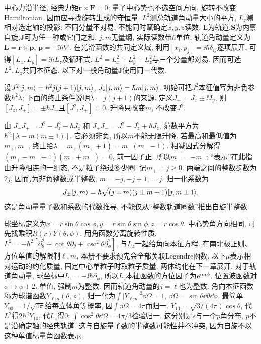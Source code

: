 中心力沿半径, 经典力矩$\boldsymbol r\times\boldsymbol F=0$; 量子中心势也不选空间方向, 旋转不改变Hamiltonian. 因而应寻找旋转生成的守恒量. $L^2$测总轨道角动量大小的平方, $L_z$测相对选定轴的投影; 不同分量不对易, 不能同时赋确定$x,y,z$读数. $\boldsymbol L$为轨道,$\boldsymbol S$为内禀自旋,$\boldsymbol J$可为任一种或它们之和. $j,m$无量纲, 实际读数带$\hbar$单位. 轨道角动量定义为$\boldsymbol L=\boldsymbol r\times\boldsymbol p$, $\boldsymbol p=-\ii\hbar\nabla$. 在光滑函数的共同定义域, 利用$[x_i,p_j]=\ii\hbar\delta_{ij}$逐项展开, 可得$[L_x,L_y]=\ii\hbar L_z$及循环式. $L^2=L_x^2+L_y^2+L_z^2$与三个分量都对易. 因而可选$L^2,L_z$共同本征态. 以下对一般角动量$\boldsymbol J$使用同一代数.

设$J^2\lvert j,m\rangle=\hbar^2j(j+1)\lvert j,m\rangle$, $J_z\lvert j,m\rangle=\hbar m\lvert j,m\rangle$. 初始可把$J^2$本征值写为非负参数$\hbar^2\lambda$; 下面的终止条件说明$\lambda=j(j+1)$的来源. 定义$J_\pm=J_x\pm\ii J_y$, 则$[J_z,J_\pm]=\pm\hbar J_\pm$且$[J^2,J_\pm]=0$. 升降只改变$m$, 不改变$J^2$.

由 $J_-J_+=J^2-J_z^2-\hbar J_z$ 和 $J_+J_-=J^2-J_z^2+\hbar J_z$, 范数平方为$\hbar^2[\lambda-m(m\pm1)]$. 它必须非负, 所以$m$不能无限升降. 若最高和最低值为$m_+,m_-$, 终止给$\lambda=m_+(m_++1)=m_-(m_--1)$. 相减因式分解得$(m_+-m_-+1)(m_++m_-)=0$, 前一因子正, 所以$m_-=-m_+$; “表示”在此指由升降相连的一组态, 不是粒子绕过多少圈. 记$m_+=j\ge0$. 两端之间的整数步数为$2j$, 因而$j$为非负整数或半整数, $m=-j,-j+1,\ldots,j$. 归一化系数为
\[
J_\pm\lvert j,m\rangle=\hbar\sqrt{(j\mp m)(j\pm m+1)}\lvert j,m\pm1\rangle.
\]
这是角动量量子数和系数的代数推导, 不能仅从“整数轨道圈数”推出自旋半整数.

球坐标定义为$x=r\sin\theta\cos\phi,y=r\sin\theta\sin\phi,z=r\cos\theta$. 中心势角方向相同, 可先找乘积$R(r)Y(\theta,\phi)$, 用角函数分离旋转性质. $L^2=-\hbar^2[\partial_\theta^2+\cot\theta\partial_\theta+\csc^2\theta\partial_\phi^2]$, 与$L_z$一起给角向本征方程. 在南北极正则、方位单值的解限制$\ell,m$, 本册不要求预先会全部关联Legendre函数. 以下$\mu$表示相对运动的约化质量, 固定中心单粒子时取粒子质量; 两体约化在下一章展开. 对于轨道角动量, 球坐标中$L_z=-\ii\hbar\partial_\phi$, 所以$L_z$本征函数的方位因子为$\mathrm e^{\mathrm i m\phi}$. 位置波函数对$\phi\mapsto\phi+2\pi$单值, 强制$m$为整数. 因而轨道角动量的$j=\ell$也为整数. 角向本征函数称为球谐函数$Y_{\ell m}(\theta,\phi)$, 归一化为$\int|Y_{\ell m}|^2\dd\Omega=1$, $\dd\Omega=\sin\theta\dd\theta\dd\phi$. 最简单$Y_{00}=1/\sqrt{4\pi}$给每立体角等概率, 因$\int\dd\Omega=4\pi$而归一. $Y_{10}=\sqrt{3/(4\pi)}\cos\theta$, 代$L^2$得$2\hbar^2Y_{10}$, 代$L_z$得0; $\int\cos^2\theta\dd\Omega=4\pi/3$检验归一. 这分别是$s$与一个$p$角分布, $p$不是沿确定轴的经典轨道. 这与自旋量子数的半整数可能性并不冲突, 因为自旋不以这种单值标量角函数表示.

